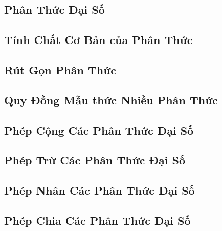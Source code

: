\documentclass{article}
\numberwithin{equation}{section}
\begin{document}
\subsection{Phân Thức Đại Số}


\subsection{Tính Chất Cơ Bản của Phân Thức}


\subsection{Rút Gọn Phân Thức}


\subsection{Quy Đồng Mẫu thức Nhiều Phân Thức}


\subsection{Phép Cộng Các Phân Thức Đại Số}


\subsection{Phép Trừ Các Phân Thức Đại Số}


\subsection{Phép Nhân Các Phân Thức Đại Số}


\subsection{Phép Chia Các Phân Thức Đại Số}
\end{document}
